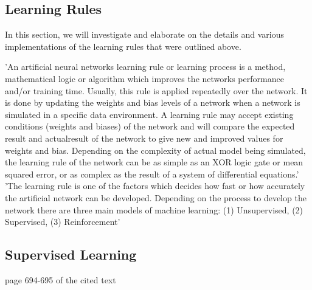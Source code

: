 \subsection{Learning Rules}
In this section, we will investigate and elaborate on the details and various implementations of the learning rules that were outlined above.

'An artificial neural networks learning rule or learning process is a method, mathematical logic or algorithm which improves the networks performance and/or training time. Usually, this rule is applied repeatedly over the network. It is done by updating the weights and bias levels of a network when a network is simulated in a specific data environment. A learning rule may accept existing conditions (weights and biases) of the network and will compare the expected result and actualresult of the network to give new and improved values for weights and bias. Depending on the complexity of actual model being simulated, the learning rule of the network can be as simple as an XOR logic gate or mean squared error, or as complex as the result of a system of differential equations.'
'The learning rule is one of the factors which decides how fast or how accurately the artificial network can be developed. Depending on the process to develop the network there are three main models of machine learning: (1) Unsupervised, (2) Supervised, (3) Reinforcement'



\subsection{Supervised Learning}

page 694-695 of the cited text

